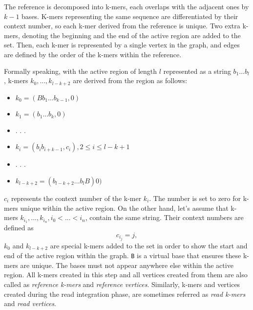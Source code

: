 The reference is decomposed into k-mers, each overlaps with the adjacent ones by $k-1$ bases. K-mers representing the same sequence are differentiated by their context number, so each k-mer derived from the reference is unique. Two extra k-mers, denoting the beginning and the end of the active region are added to the set. Then, each k-mer is represented by a single vertex in the graph, and edges are defined by the order of the k-mers within the reference.

Formally speaking, with the active region of length $l$ represented as a string $b_1 \ldots b_{l}$, k-mers $k_0, ..., k_{l-k+2}$ are derived from the region as follows:
\begin{itemize}
\item $k_0 = (Bb_1 \ldots b_{k-1}, 0)$
\item $k_1 = (b_1 \ldots b_k, 0)$
\item . . .
\item $k_i = (b_i b_{i+k-1}, c_i), 2 \leq i \leq  l-k+1$
\item . . .
\item $k_{l-k+2} = (b_{l-k+2} \ldots b_lB) 0)$
\end{itemize}
$c_i$ represents the context number of the k-mer $k_i$. The number is set to zero for k-mers unique within the active region. On the other hand, let's assume that k-mers $k_{i_1}, ..., k_{i_n}, i_0 < ... < i_n$, contain the same string. Their context numbers are defined as
$$
c_{i_j} = j, 
$$
$k_0$ and $k_{l-k+2}$ are special k-mers added to the set in order to show the start and end of the active region within the graph. \texttt{B} is a virtual base that ensures these k-mers are unique. The bases must not appear anywhere else within the active region. All k-mers created in this step and all vertices created from them are also called as \textit{reference k-mers} and \textit{reference vertices}. Similarly, k-mers and vertices created during the read integration phase, are sometimes referred as \textit{read k-mers} and \textit{read vertices}.

